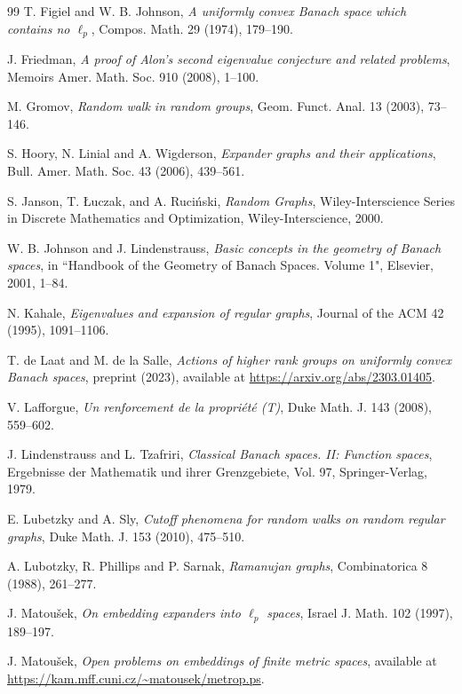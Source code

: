 \documentclass[11pt,leqno]{amsart}
\theoremstyle{remark}
\theoremstyle{plain}
\begin{document}
\begin{thebibliography}{99}
 T. Figiel and W. B. Johnson,
\emph{A uniformly convex Banach space which contains no $\ell_p$},
Compos. Math. 29 (1974), 179--190.

 J. Friedman,
\emph{A proof of Alon’s second eigenvalue conjecture and related problems},
Memoirs Amer. Math. Soc. 910 (2008), 1--100.

 M. Gromov,
\emph{Random walk in random groups},
Geom. Funct. Anal. 13 (2003), 73--146.

 S. Hoory, N. Linial and A. Wigderson,
\emph{Expander graphs and their applications},
Bull. Amer. Math. Soc. 43 (2006), 439--561.

 S. Janson, T. {\L}uczak, and A. Ruci\'{n}ski,
\emph{Random Graphs},
Wiley-Interscience Series in Discrete Mathematics and Optimization, Wiley-Interscience, 2000.

 W. B. Johnson and J. Lindenstrauss,
\emph{Basic concepts in the geometry of Banach spaces},
in ``Handbook of the Geometry of Banach Spaces. Volume 1"\!, Elsevier, 2001, 1--84.

 N. Kahale,
\emph{Eigenvalues and expansion of regular graphs},
Journal of the ACM 42 (1995), 1091--1106.

T. de Laat and M. de la Salle,
\emph{Actions of higher rank groups on uniformly convex Banach spaces},
preprint (2023), available at \url{https://arxiv.org/abs/2303.01405}.

 V. Lafforgue,
\emph{Un renforcement de la propri\'{e}t\'{e} (T)},
Duke Math. J. 143 (2008), 559--602.

 J. Lindenstrauss and L. Tzafriri,
\emph{Classical Banach spaces. II: Function spaces},
Ergebnisse der Mathematik und ihrer Grenzgebiete, Vol. 97, Springer-Verlag, 1979.

 E. Lubetzky and A. Sly,
\emph{Cutoff phenomena for random walks on random regular graphs},
Duke Math. J. 153 (2010), 475--510.

 A. Lubotzky, R. Phillips and P. Sarnak,
\emph{Ramanujan graphs},
Combinatorica 8 (1988), 261--277.

 J. Matou\v{s}ek,
\emph{On embedding expanders into $\ell_p$ spaces},
Israel J. Math. 102 (1997), 189--197.

  J. Matou\v{s}ek,
\emph{Open problems on embeddings of finite metric spaces},
available at \url{https://kam.mff.cuni.cz/~matousek/metrop.ps}.


\end{thebibliography}
\end{document}
